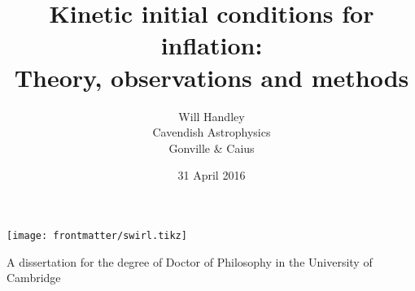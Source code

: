 \title{Kinetic initial conditions for inflation:\\ {\large Theory, observations and methods}}

\author{Will Handley\\
Cavendish Astrophysics \\
Gonville \& Caius}
\date{31 April 2016}

\begin{titlingpage}
\maketitle
\begin{center}
  \texttt{[image: frontmatter/swirl.tikz]}

  A dissertation for the degree of Doctor of Philosophy
  in the University of Cambridge 
\end{center}

\end{titlingpage}

